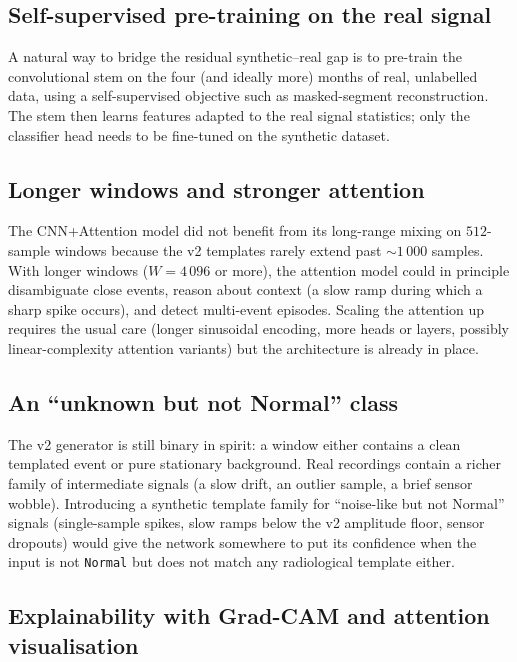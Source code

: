 \subsection{Self-supervised pre-training on the real signal}

A natural way to bridge the residual synthetic--real gap is to
pre-train the convolutional stem on the four (and ideally more) months
of real, unlabelled data, using a self-supervised objective such as
masked-segment reconstruction. The stem then learns features adapted
to the real signal statistics; only the classifier head needs to be
fine-tuned on the synthetic dataset.

\subsection{Longer windows and stronger attention}
\label{sec:future-attention}

The CNN+Attention model did not benefit from its long-range mixing on
$512$-sample windows because the v2 templates rarely extend past
$\sim 1\,000$ samples. With longer windows ($W = 4\,096$ or more), the
attention model could in principle disambiguate close events, reason
about context (a slow ramp during which a sharp spike occurs), and
detect multi-event episodes. Scaling the attention up requires the
usual care (longer sinusoidal encoding, more heads or layers, possibly
linear-complexity attention variants) but the architecture is already
in place.

\subsection{An ``unknown but not Normal'' class}

The v2 generator is still binary in spirit: a window either contains a
clean templated event or pure stationary background. Real recordings
contain a richer family of intermediate signals (a slow drift, an
outlier sample, a brief sensor wobble). Introducing a synthetic
template family for ``noise-like but not Normal'' signals (single-sample
spikes, slow ramps below the v2 amplitude floor, sensor dropouts) would
give the network somewhere to put its confidence when the input is not
\texttt{Normal} but does not match any radiological template either.

\subsection{Explainability with Grad-CAM and attention visualisation}

